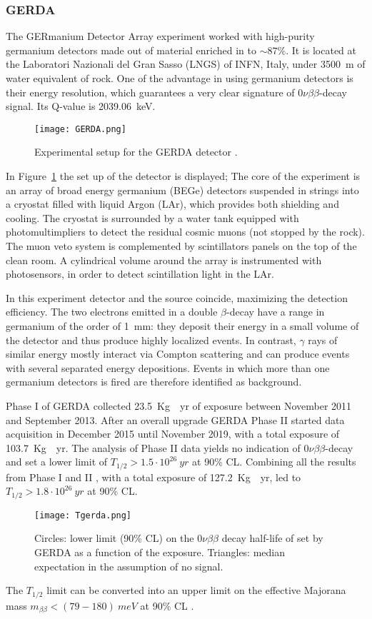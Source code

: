 \documentclass{subnucbo}
\begin{document}
\subsubsection{GERDA}
The GERmanium Detector Array experiment worked with high-purity germanium detectors made out of material enriched in  to $\sim87\%$. It is located at the Laboratori Nazionali del Gran Sasso (LNGS) of INFN, Italy,  under \SI{3500}{m} of water equivalent of rock.
One of the advantage in using germanium detectors is their energy resolution, which guarantees a very clear signature of $0\nu\beta\beta$-decay signal. Its Q-value is \SI{2039.06}{keV}.
\begin{figure}
\centering
\texttt{[image: GERDA.png]}
\caption{Experimental setup for the GERDA detector \cite{ref:gerLay}.}
\label{fig:GerLayout}
\end{figure}
In Figure~\ref{fig:GerLayout} the set up of the detector is displayed; The core of the experiment is an array of broad energy germanium (BEGe) detectors suspended in strings into a cryostat filled with liquid Argon (LAr), which provides both shielding and cooling.
The cryostat is surrounded by a water tank equipped with photomultimpliers to detect the residual cosmic muons (not stopped by the rock). The muon veto system is complemented by scintillators panels on the top of the clean room.
A cylindrical volume around the array is instrumented with photosensors, in order to detect scintillation light in the LAr.

In this experiment detector and the source coincide, maximizing the detection efficiency.
The two electrons emitted in a double $\beta$-decay have a range in germanium of the order of \SI{1}{mm}: they deposit their energy in a small volume of the detector and thus produce highly localized events. In contrast, $\gamma$ rays of similar energy mostly interact via Compton scattering and can produce events with several separated energy depositions. Events in which more than one germanium detectors is fired are therefore identified as background.

Phase I of GERDA collected \SI{23.5}{Kg\cdot yr} of exposure between November 2011 and September 2013. After an overall upgrade GERDA Phase II started data acquisition in December 2015 until November 2019, with a total exposure of \SI{103.7}{Kg\cdot yr}.
The analysis of Phase II data yields no indication of $0\nu\beta\beta$-decay and set a lower limit of $T_{1/2}>1.5\cdot10^{26}\SI{}{yr}$ at 90\% CL. Combining all the results from Phase I and II , with a total exposure of \SI{127.2}{Kg\cdot yr}, led to $T_{1/2}>1.8\cdot10^{26}\SI{}{yr}$ at 90\% CL.
\begin{figure}
\centering
\texttt{[image: Tgerda.png]}
\caption{Circles: lower limit (90\% CL) on the $0\nu\beta\beta$ decay half-life of  set by GERDA as a function of the exposure. Triangles: median expectation in the assumption of no signal. \cite{ref:gerda}}
\label{fig:Tgerda}
\end{figure}
The $T_{1/2}$ limit can be converted into an upper limit on the effective Majorana mass $m_{\beta\beta}<(79-180)\SI{}{meV}$ at 90\% CL \cite{ref:gerda}.
\end{document}
